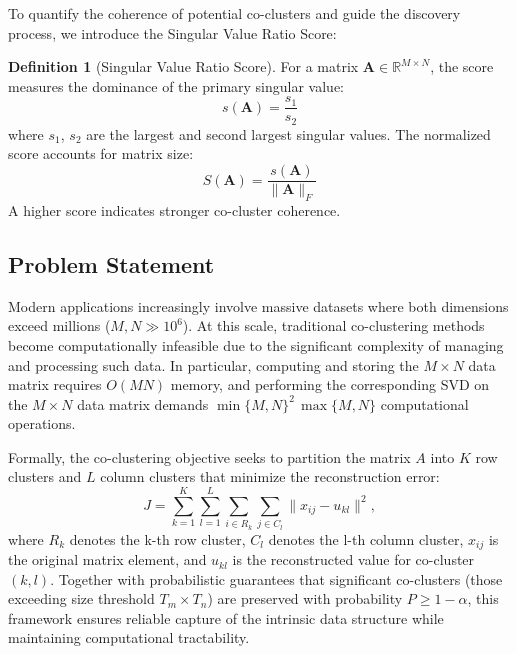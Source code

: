 \documentclass[journal]{IEEEtran}
\theoremstyle{definition}
\newtheorem{definition}{Definition}
\theoremstyle{remark} %
\begin{document}
To quantify the coherence of potential co-clusters and guide the discovery process, we introduce the Singular Value Ratio Score:

\begin{definition}[Singular Value Ratio Score]
    For a matrix $\mathbf{A} \in \mathbb{R}^{M \times N}$, the score measures the dominance of the primary singular value:
    \begin{equation}
        s(\mathbf{A}) = \frac{s_1}{s_2}
    \end{equation}
    where $s_1$, $s_2$ are the largest and second largest singular values. The normalized score accounts for matrix size:
    \begin{equation}
        S(\mathbf{A}) = \frac{s(\mathbf{A})}{\|\mathbf{A}\|_F}
    \end{equation}
    A higher score indicates stronger co-cluster coherence.
\end{definition}

\subsection{Problem Statement}
\label{subsec:problem-statement}
Modern applications increasingly involve massive datasets where both dimensions exceed millions ($M, N \gg 10^6$). At this scale, traditional co-clustering methods become computationally infeasible due to the significant complexity of managing and processing such data. {\color{blue}In particular, computing and storing the $M \times N$ data matrix requires $O(MN)$ memory, and performing the corresponding SVD on the $M \times N$ data matrix demands $\min\{M,N\}^2\,\max\{M,N\}$ computational operations.}

    {\color{blue}Formally, the co-clustering objective seeks to partition the matrix $A$ into $K$ row clusters and $L$ column clusters that minimize the reconstruction error:
        \begin{equation}\label{eq:co-clustering-objective}
            J = \sum_{k=1}^{K} \sum_{l=1}^{L} \sum_{i \in R_k} \sum_{j \in C_l} \| x_{ij} - u_{kl} \|^2,
        \end{equation}
        where $R_k$ denotes the k-th row cluster, $C_l$ denotes the l-th column cluster, $x_{ij}$ is the original matrix element, and $u_{kl}$ is the reconstructed value for co-cluster $(k,l)$.}
Together with probabilistic guarantees that significant co-clusters (those exceeding size threshold $T_m \times T_n$) are preserved with probability $P \geq 1 - \alpha$, this framework ensures reliable capture of the intrinsic data structure while maintaining computational tractability.
\end{document}
